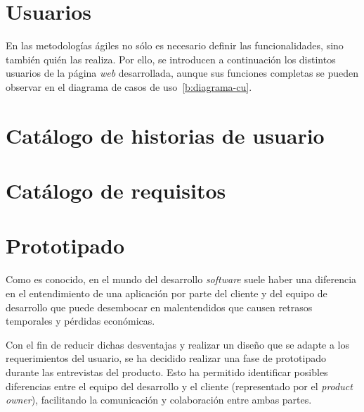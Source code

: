 \section{Usuarios}
\label{s:usuarios}

En las metodologías ágiles no sólo es necesario definir las funcionalidades, sino también quién las realiza. Por ello, se introducen a continuación los distintos usuarios de la página \textit{web} desarrollada, aunque sus funciones completas se pueden observar en el diagrama de casos de uso~\ref{b:diagrama-cu}.

\section{Catálogo de historias de usuario}
\label{s:hu}

\begin{table}
	\caption[Historias de usuario:]{Ejemplo de estructura tabular para recoger una historia de usuario}
	\label{hu:estructura-tabular}
\end{table}


\section{Catálogo de requisitos}
\label{s:cat-requisitos}

\section{Prototipado}
\label{s:mockups}

Como es conocido, en el mundo del desarrollo \textit{software} suele haber una diferencia en el entendimiento de una aplicación por parte del cliente y del equipo de desarrollo que puede desembocar en malentendidos que causen retrasos temporales y pérdidas económicas.

Con el fin de reducir dichas desventajas y realizar un diseño que se adapte a los requerimientos del usuario, se ha decidido realizar una fase de prototipado durante las entrevistas del producto. Esto ha permitido identificar posibles diferencias entre el equipo del desarrollo y el cliente (representado por el \textit{product owner}), facilitando la comunicación y colaboración entre ambas partes.

